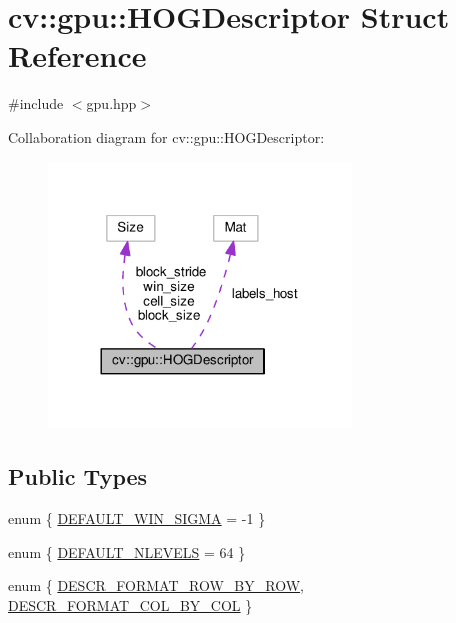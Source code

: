 \hypertarget{structcv_1_1gpu_1_1HOGDescriptor}{\section{cv\-:\-:gpu\-:\-:H\-O\-G\-Descriptor Struct Reference}
\label{structcv_1_1gpu_1_1HOGDescriptor}
}


{\ttfamily \#include $<$gpu.\-hpp$>$}



Collaboration diagram for cv\-:\-:gpu\-:\-:H\-O\-G\-Descriptor\-:\nopagebreak
\begin{figure}[H]
\begin{center}
\leavevmode
\includegraphics[width=228pt]{structcv_1_1gpu_1_1HOGDescriptor__coll__graph}
\end{center}
\end{figure}
\subsection*{Public Types}
\begin{DoxyCompactItemize}
\item 
enum \{ \hyperlink{structcv_1_1gpu_1_1HOGDescriptor_adf9ce8dfaa7a56f91eaf329fd7eb2fc4a833f2a58ab55cf7a2cb49366d64d066b}{D\-E\-F\-A\-U\-L\-T\-\_\-\-W\-I\-N\-\_\-\-S\-I\-G\-M\-A} = -\/1
 \}
\item 
enum \{ \hyperlink{structcv_1_1gpu_1_1HOGDescriptor_af4e544ecf8908d961b849f457c6db7a2ae00e31f310c33d88c6b1fe11f6146b16}{D\-E\-F\-A\-U\-L\-T\-\_\-\-N\-L\-E\-V\-E\-L\-S} = 64
 \}
\item 
enum \{ \hyperlink{structcv_1_1gpu_1_1HOGDescriptor_aec73725a02c7ce1aff7a0587391abecaad73e5878268db334a78ec62d779f5d7d}{D\-E\-S\-C\-R\-\_\-\-F\-O\-R\-M\-A\-T\-\_\-\-R\-O\-W\-\_\-\-B\-Y\-\_\-\-R\-O\-W}, 
\hyperlink{structcv_1_1gpu_1_1HOGDescriptor_aec73725a02c7ce1aff7a0587391abecaaf310a595ef7d638c2d05f405dc55817b}{D\-E\-S\-C\-R\-\_\-\-F\-O\-R\-M\-A\-T\-\_\-\-C\-O\-L\-\_\-\-B\-Y\-\_\-\-C\-O\-L}
 \}
\end{DoxyCompactItemize}
